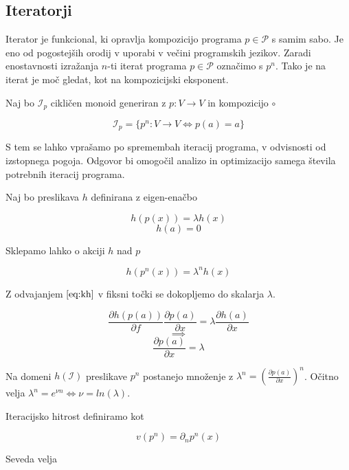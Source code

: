 \documentclass{article}
\newcommand{\dP}{\mathcal{P}}
\newcommand{\D}{\partial}
\begin{document}
  \subsection{Iteratorji}
  
  Iterator je funkcional, ki opravlja kompozicijo programa $p\in\dP$ s samim sabo. Je eno od pogostejših orodij v uporabi v večini programskih jezikov. Zaradi  enostavnosti izražanja $n$-ti iterat programa $p\in\dP$ označimo s $p^n$. Tako je na iterat je moč gledat, kot na kompozicijski eksponent.
  
  Naj bo $\mathcal{I}_p$ cikličen monoid generiran z $p:V\to V$ in kompozicijo $\circ$
  
  \begin{equation}
  \mathcal{I}_p=\{p^n:V\to V\iff p(a)=a\}
  \end{equation}
  
 S tem se lahko vprašamo po spremembah iteracij programa, v odvisnosti od izstopnega pogoja. Odgovor bi omogočil analizo in optimizacijo samega števila potrebnih iteracij programa.
  
  Naj bo preslikava $h$ definirana z eigen-enačbo
  
  \begin{equation}\label{eq:kh}
  h(p(x))=\lambda h(x)
  \end{equation}
   \begin{equation}
   h(a)=0
   \end{equation}
  
  Sklepamo lahko o akciji $h$ nad $p$
  
  \begin{equation}
  h(p^n(x))=\lambda^nh(x)
  \end{equation}
  
  Z odvajanjem $\eqref{eq:kh}$ v fiksni točki se dokopljemo do skalarja $\lambda$.
  
  $$\frac{\D h(p(a))}{\D f}\frac{\D p(a)}{\D x}=\lambda\frac{\D h(a)}{\D x}$$
  $$\implies$$
  $$\frac{\D p(a)}{\D x}=\lambda$$
  
  Na domeni $h(\mathcal{I})$ preslikave $p^n$ postanejo množenje z $\lambda^n=(\frac{\D p(a)}{\D x})^n$. Očitno velja $\lambda^n=e^{\nu n}\iff \nu=ln(\lambda)$.
  
  Iteracijsko hitrost definiramo kot
  
  \begin{equation}
  v(p^n)=\D_np^n(x)
  \end{equation}
  
  Seveda velja
  
\end{document}
